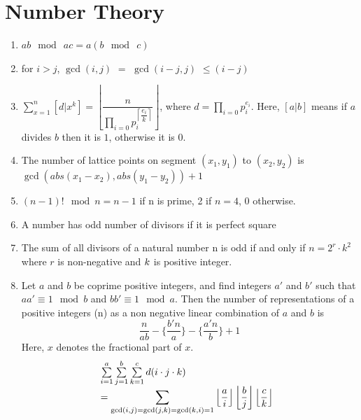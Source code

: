 \section{Number Theory}
\begin{enumerate}[resume]
    \item $\displaystyle ab \mod\ ac=a(b \mod\ c)$
    \item for $i > j$, $\displaystyle \gcd(i, j)$ $=$ $\displaystyle \gcd(i -j, j)$ $\displaystyle \leq (i -j)$
    \item $\displaystyle \sum_{x = 1}^n \left[ d | x^k \right] = \left \lfloor\dfrac{n}{\prod_{i = 0}{p_i^{\left \lceil \dfrac{e_i}{k}\right \rceil}}}\right \rfloor$,
          where $d = \prod_{i = 0}{p_i^{e_i}}$. Here, $[a | b]$ means if $\displaystyle a$ divides $b$ then it is $\displaystyle 1$, otherwise it is $0$.
    \item The number of lattice points on segment $\displaystyle (x_1,y_1)$ to $\displaystyle (x_2,y_2)$ is $\displaystyle \gcd(abs(x_1-x_2),abs(y_1-y_2)) + 1$
    \item $\displaystyle (n-1)! \mod  n = n -1$ if n is prime, 2 if $n = 4$, $0$ otherwise.
    \item A number has odd number of divisors if it is perfect square
    \item The sum of all divisors of a natural number n is odd if and only if $n=2^r\cdot k^2$ where $r$ is non-negative and $\displaystyle \displaystyle k$ is positive integer.
    \item Let $\displaystyle a$ and $b$ be coprime positive integers, and find integers $\displaystyle a{\prime}$ and $b{\prime}$ such that $\displaystyle aa{\prime} \equiv 1 \mod b$ and $bb{\prime} \equiv 1 \mod a$. Then the number of representations of a positive integers (n) as a non negative linear combination of $\displaystyle a$ and $b$ is
          \[\displaystyle \frac{n}{ab}-\Big\{\frac{b{\prime} n}{a}\Big\}-\Big\{\frac{a{\prime} n}{b}\Big\} + 1\]
          Here, $\displaystyle {x}$ denotes the fractional part of $\displaystyle x$.
          \[
              \begin{array}{@{}l}
                  \sum \limits_{i=1}^{a}\sum \limits_{j=1}^{b}\sum \limits_{k=1}^{c} d(i \cdot j \cdot k)
                  \\ =
                  \displaystyle \sum \limits_{\gcd (i,j)=\gcd (j,k) = \gcd (k,i) =1}
                  \displaystyle \left \lfloor \dfrac{a}{i}\right \rfloor \left \lfloor \dfrac{b}{j}\right \rfloor \left \lfloor \dfrac{c}{k} \right \rfloor
              \end{array}
\]
\end{enumerate}
